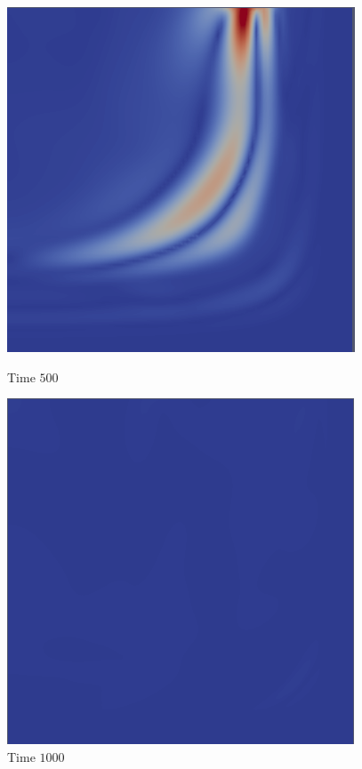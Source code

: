 \begin{figure}[H]
\centering
\begin{minipage}{.5\textwidth}
  \centering
  \includegraphics[width=1.\linewidth]{images/Lamb5.png}
  \caption{Time $500$}
  \label{fig:Lamb3}
\end{minipage}%
\begin{minipage}{.5\textwidth}
  \centering
  \includegraphics[width=1.\linewidth]{images/Lamb6.png}
  \caption{Time $1000$}
  \label{fig:Lamb4}
\end{minipage}
\end{figure} 
